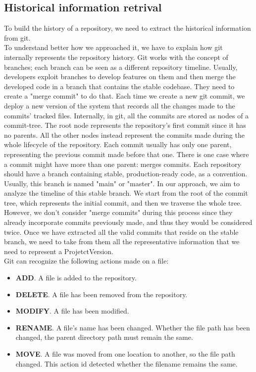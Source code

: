 \subsection*{Historical information retrival}
To build the history of a repository, we need to extract the historical information from git.\\
\bigbreak
To understand better how we approached it, we have to explain how git internally represents the repository history. 
Git works with the concept of branches; each branch can be seen as a different repository timeline.
Usually, developers exploit branches to develop features on them and then merge the developed code in a branch that contains the stable codebase.
They need to create a "merge commit" to do that. 
Each time we create a new git commit, we deploy a new version of the system that records all the changes made to the commits' tracked files. 
Internally, in git, all the commits are stored as nodes of a commit-tree. 
The root node represents the repository's first commit since it has no parents. 
All the other nodes instead represent the commits made during the whole lifecycle of the repository. 
Each commit usually has only one parent, representing the previous commit made before that one.
There is one case where a commit might have more than one parent: merges commits.
\bigbreak
Each repository should have a branch containing stable, production-ready code, as a convention. Usually, this branch is named "main" or "master". 
In our approach, we aim to analyze the timeline of this stable branch. We start from the root of the commit tree, which represents the initial commit, and then we traverse the whole tree. 
However, we don't consider "merge commits" during this process since they already incorporate commits previously made, and thus they would be considered twice. 
Once we have extracted all the valid commits that reside on the stable branch, we need to take from them all the representative information that we need to represent a ProjetctVersion. \\
\bigbreak
Git can recognize the following actions made on a file:
\begin{itemize}
    \item \textbf{ADD}. A file is added to the repository.
    \item \textbf{DELETE}. A file has been removed from the repository.
    \item \textbf{MODIFY}. A file has been modified.
    \item \textbf{RENAME}. A file's name has been changed. Whether the file path has been changed, the parent directory path must remain the same. 
    \item \textbf{MOVE}. A file was moved from one location to another, so the file path changed. This action id detected whether the filename remains the same. 
\end{itemize}

